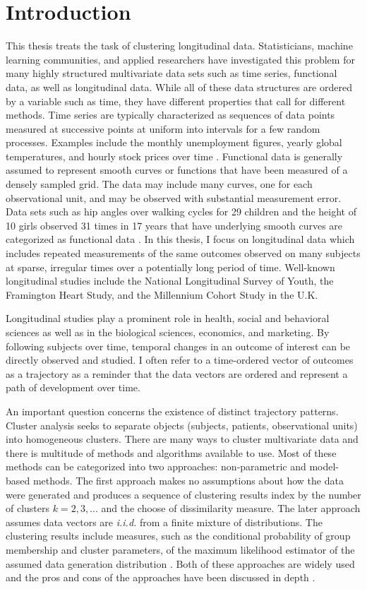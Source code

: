 \chapter{Introduction}
\label{chap: intro}

This thesis treats the task of clustering longitudinal data. Statisticians, machine learning communities, and applied researchers have investigated this problem for many highly structured multivariate data sets such as time series, functional data, as well as longitudinal data. While all of these data structures are ordered by a variable such as time, they have different properties that call for different methods. Time series are typically characterized as sequences of data points measured at successive points at uniform into intervals for a few random processes. Examples include the monthly unemployment figures, yearly global temperatures, and hourly stock prices over time \cite{shumway2011}. Functional data is generally assumed to represent smooth curves or functions that have been measured of a densely sampled grid. The data may include many curves, one for each observational unit, and may be observed with substantial measurement error. Data sets such as hip angles over walking cycles for 29 children and the height of 10 girls observed 31 times in 17 years that have underlying smooth curves are categorized as functional data \cite{ramsay2002}. In this thesis, I focus on longitudinal data which includes repeated measurements of the same outcomes observed on many subjects at sparse, irregular times over a potentially long period of time. Well-known longitudinal studies include the National Longitudinal Survey of Youth, the Framington Heart Study, and the Millennium Cohort Study in the U.K. 

Longitudinal studies play a prominent role in health, social and behavioral sciences as well as in the biological sciences, economics, and marketing. By following subjects over time, temporal changes in an outcome of interest can be directly observed and studied. I often refer to a time-ordered vector of outcomes as a trajectory as a reminder that the data vectors are ordered and represent a path of development over time. 

An important question concerns the existence of distinct trajectory patterns. Cluster analysis seeks to separate objects (subjects, patients, observational units) into homogeneous clusters. There are many ways to cluster multivariate data and there is multitude of methods and algorithms available to use. Most of these methods can be categorized into two approaches: non-parametric and model-based methods. The first approach makes no assumptions about how the data were generated and produces a sequence of clustering results index by the number of clusters $k=2,3,...$ and the choose of dissimilarity measure. The later approach assumes data vectors are \emph{i.i.d.} from a finite mixture of distributions. The clustering results include measures, such as the conditional probability of group membership and cluster parameters, of the maximum likelihood estimator of the assumed data generation distribution \cite{mclachlan2000,fraley1998}. Both of these approaches are widely used and the pros and cons of the approaches have been discussed in depth \cite{magidson2002, everitt1981}.

